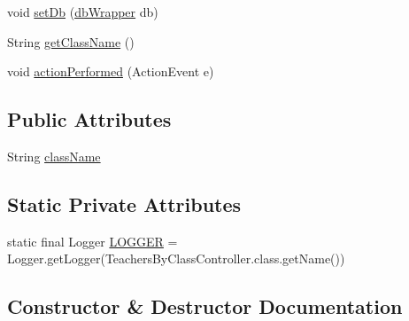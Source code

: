 \begin{DoxyCompactItemize}
\item 
void \mbox{\hyperlink{classcom_1_1_b_n_u_1_1pages_1_1teachers_by_class_1_1_teachers_by_class_controller_a2f051f5a2f9ffc2dab5c6f1415534f18}{set\+Db}} (\mbox{\hyperlink{interfacecom_1_1_b_n_u_1_1database_1_1db_wrapper}{db\+Wrapper}} db)
\item 
String \mbox{\hyperlink{classcom_1_1_b_n_u_1_1pages_1_1teachers_by_class_1_1_teachers_by_class_controller_a0abb734df318481474fa1c53d364f6c5}{get\+Class\+Name}} ()
\item 
void \mbox{\hyperlink{classcom_1_1_b_n_u_1_1pages_1_1teachers_by_class_1_1_teachers_by_class_controller_a30506f4de45423a246d61de3a301175b}{action\+Performed}} (Action\+Event e)
\end{DoxyCompactItemize}
\subsection*{Public Attributes}
\begin{DoxyCompactItemize}
\item 
String \mbox{\hyperlink{classcom_1_1_b_n_u_1_1pages_1_1teachers_by_class_1_1_teachers_by_class_controller_a932366ce6a26501dc9f975d5a0a52965}{class\+Name}}
\end{DoxyCompactItemize}
\subsection*{Static Private Attributes}
\begin{DoxyCompactItemize}
\item 
static final Logger \mbox{\hyperlink{classcom_1_1_b_n_u_1_1pages_1_1teachers_by_class_1_1_teachers_by_class_controller_a5fd979a161f64ac4f1c1920daa84e1bb}{L\+O\+G\+G\+ER}} = Logger.\+get\+Logger(Teachers\+By\+Class\+Controller.\+class.\+get\+Name())
\end{DoxyCompactItemize}


\subsection{Constructor \& Destructor Documentation}
\mbox{\label{classcom_1_1_b_n_u_1_1pages_1_1teachers_by_class_1_1_teachers_by_class_controller_a7766424f098a93b3b75be4b51b6e05ef}} 
